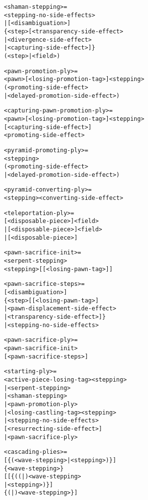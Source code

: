 \clearpage %

\begin{alltt}
<shaman-stepping> =
  <stepping-no-side-effects>
| [<disambiguation>]
  \{<step>[<transparency-side-effect>
          | <divergence-side-effect>
          | <capturing-side-effect>]\}
  (<step> | \alg{-}<field>)

<pawn-promotion-ply> =
  <pawn>[<losing-promotion-tag>]<stepping>
  (<promoting-side-effect>
   | <delayed-promotion-side-effect>)

<capturing-pawn-promotion-ply> =
  <pawn>[<losing-promotion-tag>]<stepping>
  [<capturing-side-effect>]
  <promoting-side-effect>

<pyramid-promoting-ply> =
  <stepping>
  (<promoting-side-effect>
   | <delayed-promotion-side-effect>)

<pyramid-converting-ply> =
  <stepping><converting-side-effect>

<teleportation-ply> =
  \alg{|}[<disposable-piece>]<field>
| \alg{||}[<disposable-piece>]<field>
| \alg{|||}[<disposable-piece>]
\end{alltt}

\clearpage %

\begin{alltt}
<pawn-sacrifice-init> =
  <serpent-stepping>
  <stepping>[\alg{*}[<losing-pawn-tag>]]\alg{;;}

<pawn-sacrifice-steps> =
  [<disambiguation>]
    \{<step>[\alg{*}[<losing-pawn-tag>]
            | <pawn-displacement-side-effect>
            | <transparency-side-effect>]\}
| <stepping-no-side-effects>

<pawn-sacrifice-ply> =
  <pawn-sacrifice-init>
  [<pawn-sacrifice-steps>]

<starting-ply> =
  <active-piece-losing-tag><stepping>
| <serpent-stepping>
| <shaman-stepping>
| <pawn-promotion-ply>
| <losing-castling-tag><stepping>
| <stepping-no-side-effects>
    [<resurrecting-side-effect>]
| <pawn-sacrifice-ply>

<cascading-plies> =
  [\{(<wave-stepping> | <stepping>)\}]
  \{<wave-stepping>\}
  [ [\{((\alg{~}|\alg{|})<wave-stepping>
       | <stepping>)\}]
    \{(\alg{~}|\alg{|})<wave-stepping>\} ]
\end{alltt}

\clearpage %

